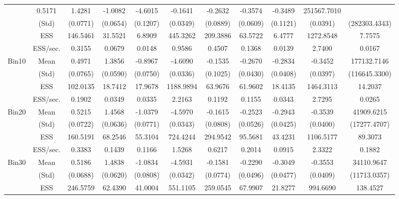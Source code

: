 {{\begin{table}
\begin{tabular}{cc ccc ccc ccc}
 & 0.5171  & 1.4281  & -1.0082  & -4.6015  & -0.1641  & -0.2632  & -0.3574  & -0.3489  & 251567.7010  \\  [0.75ex] 
 & (Std) 
 & (0.0771)  & (0.0654)  & (0.1207)  & (0.0349)  & (0.0889)  & (0.0609)  & (0.1121)  & (0.0391)  & (282303.4343)  \\  [0.75ex] 
 & ESS 
 & 146.5461  & 31.5521  & 6.8909  & 445.3262  & 209.3886  & 63.5722  & 6.4777  & 1272.8548  & 7.7575  \\  [0.75ex] 
[464.55 s]  & ESS/sec. 
 & 0.3155  & 0.0679  & 0.0148  & 0.9586  & 0.4507  & 0.1368  & 0.0139  & 2.7400  & 0.0167  \\  [1.3ex] 
\rowcolor{LightCyan}Bin10 & Mean 
 & 0.4971  & 1.3856  & -0.8967  & -4.6090  & -0.1535  & -0.2670  & -0.2834  & -0.3452  & 177132.7146  \\  [0.75ex] 
 & (Std) 
 & (0.0765)  & (0.0590)  & (0.0750)  & (0.0336)  & (0.1025)  & (0.0430)  & (0.0408)  & (0.0397)  & (116645.3300)  \\  [0.75ex] 
 & ESS 
 & 102.0135  & 18.7412  & 17.9678  & 1188.9894  & 63.9676  & 61.9602  & 18.4135  & 1464.3113  & 14.2037  \\  [0.75ex] 
[536.47 s]  & ESS/sec. 
 & 0.1902  & 0.0349  & 0.0335  & 2.2163  & 0.1192  & 0.1155  & 0.0343  & 2.7295  & 0.0265  \\  [1.3ex] 
\rowcolor{LightCyan}Bin20 & Mean 
 & 0.5215  & 1.4568  & -1.0379  & -4.5970  & -0.1615  & -0.2523  & -0.2943  & -0.3539  & 41909.6215  \\  [0.75ex] 
 & (Std) 
 & (0.0722)  & (0.0636)  & (0.0771)  & (0.0343)  & (0.0808)  & (0.0526)  & (0.0425)  & (0.0400)  & (17277.4707)  \\  [0.75ex] 
 & ESS 
 & 160.5191  & 68.2546  & 55.3104  & 724.4244  & 294.9542  & 95.5681  & 43.4231  & 1106.5177  & 89.3073  \\  [0.75ex] 
[474.46 s]  & ESS/sec. 
 & 0.3383  & 0.1439  & 0.1166  & 1.5268  & 0.6217  & 0.2014  & 0.0915  & 2.3322  & 0.1882  \\  [1.3ex] 
\rowcolor{LightCyan}Bin30 & Mean 
 & 0.5186  & 1.4838  & -1.0834  & -4.5931  & -0.1581  & -0.2290  & -0.3049  & -0.3553  & 34110.9647  \\  [0.75ex] 
 & (Std) 
 & (0.0688)  & (0.0620)  & (0.0808)  & (0.0342)  & (0.0774)  & (0.0496)  & (0.0477)  & (0.0409)  & (11713.0357)  \\  [0.75ex] 
 & ESS 
 & 246.5759  & 62.4390  & 41.0004  & 551.1105  & 259.0545  & 67.9907  & 21.8277  & 994.6690  & 138.4527  \\  [0.75ex] 

\end{tabular}
\end{table}}}
